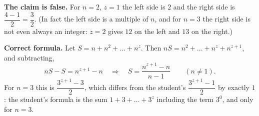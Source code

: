 \textbf{The claim is false.} For $n=2$, $z=1$ the left side is $2$ and the right side is $\dfrac{4-1}{2}=\dfrac{3}{2}$. (In fact the left side is a multiple of $n$, and for $n=3$ the right side is not even always an integer: $z=2$ gives $12$ on the left and $13$ on the right.)

\textbf{Correct formula.} Let $S=n+n^2+\dots+n^z$. Then $nS=n^2+\dots+n^z+n^{z+1}$, and subtracting,
\[
nS-S=n^{z+1}-n\quad\Longrightarrow\quad \boxed{S=\dfrac{n^{z+1}-n}{n-1}}\qquad(n\ne1).
\]
For $n=3$ this is $\dfrac{3^{z+1}-3}{2}$, which differs from the student's $\dfrac{3^{z+1}-1}{2}$ by exactly $1$: the student's formula is the sum $1+3+\dots+3^z$ including the term $3^0$, and only for $n=3$.
